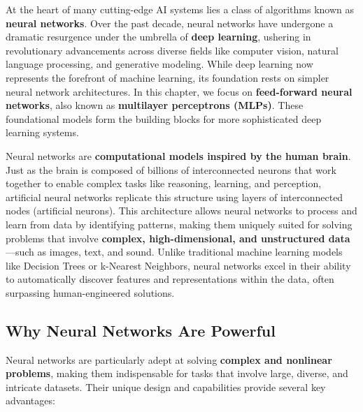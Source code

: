 \documentclass[
]{book}
\theoremstyle{definition}
\theoremstyle{definition}
\theoremstyle{definition}
\theoremstyle{definition}
\theoremstyle{remark}
\begin{document}
At the heart of many cutting-edge AI systems lies a class of algorithms known as \textbf{neural networks}. Over the past decade, neural networks have undergone a dramatic resurgence under the umbrella of \textbf{deep learning}, ushering in revolutionary advancements across diverse fields like computer vision, natural language processing, and generative modeling. While deep learning now represents the forefront of machine learning, its foundation rests on simpler neural network architectures. In this chapter, we focus on \textbf{feed-forward neural networks}, also known as \textbf{multilayer perceptrons (MLPs)}. These foundational models form the building blocks for more sophisticated deep learning systems.

Neural networks are \textbf{computational models inspired by the human brain}. Just as the brain is composed of billions of interconnected neurons that work together to enable complex tasks like reasoning, learning, and perception, artificial neural networks replicate this structure using layers of interconnected nodes (artificial neurons). This architecture allows neural networks to process and learn from data by identifying patterns, making them uniquely suited for solving problems that involve \textbf{complex, high-dimensional, and unstructured data}---such as images, text, and sound. Unlike traditional machine learning models like Decision Trees or k-Nearest Neighbors, neural networks excel in their ability to automatically discover features and representations within the data, often surpassing human-engineered solutions.

\subsection*{Why Neural Networks Are Powerful}\label{why-neural-networks-are-powerful}

Neural networks are particularly adept at solving \textbf{complex and nonlinear problems}, making them indispensable for tasks that involve large, diverse, and intricate datasets. Their unique design and capabilities provide several key advantages:
\end{document}
